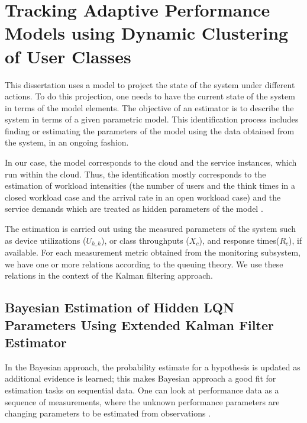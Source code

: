  \chapter{Tracking Adaptive Performance Models using Dynamic Clustering of User Classes}
 \label{ch:estimation} 

  This dissertation uses a model to project the state of the system under different actions. 
 To do this projection, one needs to have the current state of the system in terms of the model elements. The objective of an estimator is to describe the system in terms of a given parametric model. This identification process includes finding or estimating the parameters of the model using the data obtained from the system, in an ongoing fashion.  
 
 In our case, the model corresponds to the cloud and the service instances, which run within the cloud. Thus, the identification mostly corresponds to the estimation of workload intensities (the number of users and the think times in a closed workload case and the arrival rate in an open workload case) and the service demands which are treated as hidden parameters of the model
\cite{
rolia_parameter_1995,
rolia_correlating_1998,
courtois_using_2000,
pacifici_cpu_2008,
zhang_regression-based_2007,
zhang_workload_2002,
liu_parameter_2006,
gmach_workload_2007,
gmach_capacity_2007}. 

  The estimation is carried out using the measured parameters of the system such as device utilizations ($U_{h,k}$), or class throughputs ($X_{c}$), and response times($R_c$), if available.
     For each measurement metric obtained from the monitoring subsystem, we have one or more relations according to the queuing theory. We use these relations in the context of the Kalman filtering approach.  
		
		
  \section{Bayesian Estimation of Hidden LQN Parameters Using Extended Kalman Filter Estimator}    
  \label{sec:bayesian-estimation}  
   In the Bayesian approach, the probability estimate for a hypothesis is updated as additional evidence is learned; this makes Bayesian approach a good fit for estimation tasks on sequential data. One can look at performance data as a sequence of measurements, where the unknown performance parameters are changing parameters to be estimated from observations  \cite{woodside_use_2005,xu_performance_2005,zheng_tracking_2005}.
   
